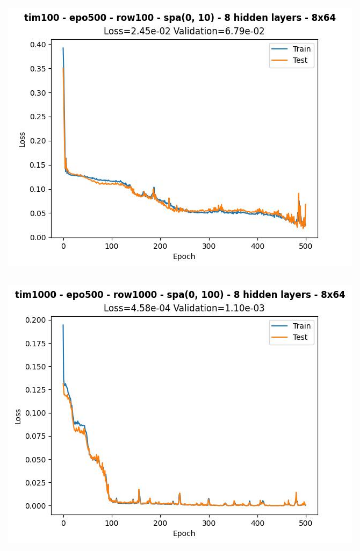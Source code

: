 \begin{figure}[H]
    \centering
    \begin{subfigure}{.47\linewidth}
        \centering
        \includegraphics[width=\textwidth]{other-models/2024-05-25T10:37:13.908871_pendulum_tim100_epo500_row100_spa(0, 10).jpg}
    \end{subfigure}
    \begin{subfigure}{.47\linewidth}
        \centering
        \includegraphics[width=\textwidth]{other-models/2024-05-20T22:25:37.594568_pendulum_tim1000_epo500_row1000_spa(0, 100).jpg}
    \end{subfigure}
    \begin{subfigure}{.47\linewidth}
        \centering

\end{subfigure}
\end{figure}
